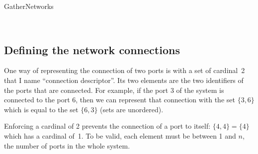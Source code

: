 \begin{algorithm}[hbtp]
    \caption{GatherNetworks}
    \label{algo:gather_networks}
    \begin{algorithmic}
         
         
        \State{}
                
        \EndFor
        \State{}
        \State{}
         
        \EndFor
        \\ 
        \EndFunction
    \end{algorithmic}
\end{algorithm}



\subsection{Defining the network connections}

One way of representing the connection of two ports is with a set of cardinal~2 that I name ``connection descriptor''.
Its two elements are the two identifiers of the ports that are connected.
For example, if the port 3 of the system is connected to the port 6, then we can represent that connection with the set $\lbrace 3, 6\rbrace$ which is equal to the set $\lbrace 6, 3\rbrace$ (sets are unordered).

Enforcing a cardinal of 2 prevents the connection of a port to itself: $\lbrace 4, 4\rbrace = \lbrace 4\rbrace$ which has a cardinal of~1.
To be valid, each element must be between 1 and $n$, the number of ports in the whole system.

